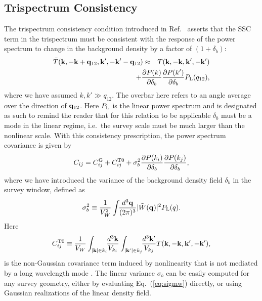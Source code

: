 \documentclass[prd,twocolumn,amsmath,amssymb,floatfix,superscriptaddress]{revtex4-1}
\newcommand{\bk}{{\bf k}}
\newcommand{\bq}{{\bf q}}
\newcommand{\lin}{{\rm L}}
\newcommand{\tW}{\tilde{W}}
\begin{document}
\subsection{Trispectrum Consistency}

The trispectrum consistency condition introduced in Ref.~\cite{Takada:2013wfa} asserts
that the SSC term in the trispectrum must be consistent with the response of the
power spectrum to change in the background density by a factor of
$(1+\delta_b)$:
%
\begin{eqnarray}
\bar T(\bk,-\bk+\bq_{12},\bk',-\bk'-\bq_{12})
&\approx&  {T}(\bk,-\bk,\bk',-\bk')\nonumber\\
&&\hspace{-5em}+
\frac{\partial P(k)}{\partial \delta_b} \frac{\partial P(k')}{\partial \delta_b} P_\lin(q_{12}),
\label{eq:consistency}
\end{eqnarray}
%
where we have assumed $k, k'\gg q_{12}$.  The overbar here refers to an
angle average over the direction of $\bq_{12}$. 
Here $P_\lin$ is the
linear power spectrum and is designated as such to remind the reader
that for this relation to be applicable $\delta_b$ must be a mode in the
linear regime, i.e.\ the survey scale must be much larger than the nonlinear scale.
With this consistency prescription, the power spectrum covariance is given by %
\begin{equation}
C_{ij} = C_{ij}^{\rm G} + C_{ij}^{\text{T}0} 
+\sigma_b^2 \frac{\partial P(k_i)}{\partial \delta_b} \frac{\partial P(k_j)}{\partial \delta_b},
\label{eq:covcon}
\end{equation}
%
where we have introduced the variance of the background density
field $\delta_b$ in the survey window, defined as
%
\begin{equation}
\sigma_b^2 \equiv \frac{1}{V_W^2}
\int\!\!\frac{d^3\bq}{(2\pi)^3}
|\tW(\bq)|^2P_\lin(q).
\label{eq:sigmw}
\end{equation}
%
Here
%
\begin{equation}
 C^{\text{T}0}_{ij}\equiv\frac{1}{V_W}
\int_{|\bk|\in k_i}\!\!\frac{d^3\bk}{V_{k_i}}
\int_{|\bk'|\in k_j}\!\!\frac{d^3\bk'}{V_{k_j}}T(\bk,-\bk,\bk',-\bk'),
\end{equation}
%
is the non-Gaussian covariance term induced by nonlinearity that
is not mediated by a long wavelength mode 
 \citep{Scoccimarroetal:99}.
The linear variance $\sigma_b$ can be easily computed
for any survey geometry, either by evaluating Eq.~(\ref{eq:sigmw}) directly, or using
Gaussian realizations of the linear density field.
\end{document}
